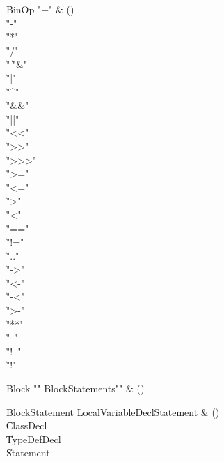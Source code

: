 \begin{bbgrammar}

BinOp \label{prod:BinOp}  \: \xcd"+" & () \\

    \| \xcd"-" \\
    \| \xcd"*" \\
    \| \xcd"/" \\
    \| \xcd"%
    \| \xcd"&" \\
    \| \xcd"|" \\
    \| \xcd"^" \\
    \| \xcd"&&" \\
    \| \xcd"||" \\
    \| \xcd"<<" \\
    \| \xcd">>" \\
    \| \xcd">>>" \\
    \| \xcd">=" \\
    \| \xcd"<=" \\
    \| \xcd">" \\
    \| \xcd"<" \\
    \| \xcd"==" \\
    \| \xcd"!=" \\
    \| \xcd".." \\
    \| \xcd"->" \\
    \| \xcd"<-" \\
    \| \xcd"-<" \\
    \| \xcd">-" \\
    \| \xcd"**" \\
    \| \xcd"~" \\
    \| \xcd"!~" \\
    \| \xcd"!" \\

\end{bbgrammar}

\begin{bbgrammar}

Block \label{prod:Block}  \: \xcd"{" BlockStatements\opt \xcd"}" & () \\


\end{bbgrammar}

\begin{bbgrammar}

BlockStatement \label{prod:BlockStatement}  \: LocalVariableDeclStatement & () \\

    \| ClassDecl \\
    \| TypeDefDecl \\
    \| Statement \\

\end{bbgrammar}

